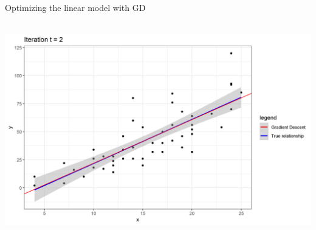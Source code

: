 \begin{vbframe}{Optimizing the linear model with GD}
	\begin{center}
	$ $ \\
	\includegraphics[width=\textwidth]{figure_man/iter2.png}\\
	\begin{footnotesize}
	\end{footnotesize}
	\end{center}

\end{vbframe}

\endlecture


